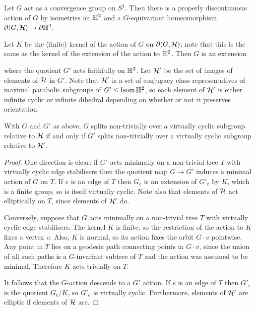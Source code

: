 \begin{theorem}\cite{tukia88,cassonjungreis94,gabai92} 
  Let $G$ act as a convergence group on $S^1$.
  Then there is a properly discontinuous action of $G$ by isometries on $\mathbb{H}^2$ and a $G$-equivariant homeomorphism $\partial(G, \mathcal{H}) \to \partial\mathbb{H}^2$.
\end{theorem}

Let $K$ be the (finite) kernel of the action of $G$ on $\partial(G, \mathcal{H})$; note that this is the same as the kernel of the extension of the action to $\mathbb{H}^2$. 
Then $G$ is an extension
 \begin{center}
\end{center}
where the quotient $G'$ acts faithfully on $\mathbb{H}^2$. 
Let $\mathcal{H}'$ be the set of images of elements of $\mathcal{H}$ in $G'$.
Note that $\mathcal{H}'$ is a set of conjugacy class representatives of maximal parabolic subgroups of $G' \leq \operatorname{\mathrm{Isom}}\mathbb{H}^2$, so each element of $\mathcal{H}'$ is either infinite cyclic or infinite dihedral depending on whether or not it preserves orientation.

\begin{lemma}\label{lemma:quotient_by_effective_kernel} 
  With $G$ and $G'$ as above, $G$ splits non-trivially over a virtually cyclic subgroup relative to $\mathcal{H}$ if and only if $G'$ splits non-trivially over a virtually cyclic subgroup relative to $\mathcal{H}'$.
\end{lemma}

\begin{proof} 
  One direction is clear: if $G'$ acts minimally on a non-trivial tree $T$ with virtually cyclic edge stabilisers then the quotient map $G \to G'$ induces a minimal action of $G$ on $T$.
  If $e$ is an edge of $T$ then $G_e$ is an extension of $G'_e$ by $K$, which is a finite group, so is itself virtually cyclic.
  Note also that elements of $\mathcal{H}$ act elliptically on $T$, since elements of $\mathcal{H}'$ do.

  Conversely, suppose that $G$ acts minimally on a non-trivial tree $T$ with virtually cyclic edge stabilisers. 
  The kernel $K$ is finite, so the restriction of the action to $K$ fixes a vertex $v$. 
  Also, $K$ is normal, so its action fixes the orbit $G\cdot v$ pointwise. 
  Any point in $T$ lies on a geodesic path connecting points in $G\cdot v$, since the union of all such paths is a $G$-invariant subtree of $T$ and the action was assumed to be minimal.  
  Therefore $K$ acts trivially on $T$.

  It follows that the $G$-action descends to a $G'$ action.
  If $e$ is an edge of $T$ then $G'_e$ is the quotient $G_e/K$, so $G'_e$ is virtually cyclic.
  Furthermore, elements of $\mathcal{H}'$ are elliptic if elements of $\mathcal{H}$ are.
\end{proof}

